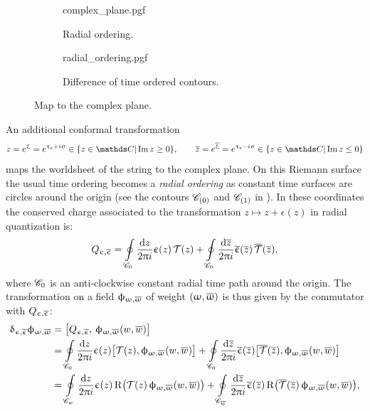 \begin{figure}[tbp]
  \centering
  \begin{subfigure}[b]{0.45\linewidth}
    \centering
    {complex_plane.pgf}
    \caption{Radial ordering.}
  \end{subfigure}
  \hfill
  \begin{subfigure}[b]{0.45\linewidth}
    \centering
    {radial_ordering.pgf}
    \caption{Difference of time ordered contours.}
  \end{subfigure}
  \caption{Map to the complex plane.}
  \label{fig:conf:complex_plane}
\end{figure}

An additional conformal transformation
\begin{equation}
  z = e^{\xi} = e^{\tau_e + i \sigma} \in \qty{ z \in \C | \Im z \ge 0 },
  \qquad
  \barz = e^{\bxi} = e^{\tau_e - i \sigma} \in \qty{ z \in \C | \Im z \le 0 }
\end{equation}
maps the worldsheet of the string to the complex plane.
On this Riemann surface the usual time ordering becomes a \emph{radial ordering} as constant time surfaces are circles around the origin (see the contours $\mathscr{C}_{(0)}$ and $\mathscr{C}_{(1)}$ in ). 
In these coordinates the conserved charge associated to the transformation $z \mapsto z + \epsilon(z)$ in radial quantization is:
\begin{equation}
  Q_{\upepsilon, \overline{\upepsilon}}
  =
  \oint\limits_{\mathscr{C}_{0}}
  \frac{\mathrm{d}z}{2 \uppi i}
  \upepsilon(z)\, \mathcal{T}(z)
  +
  \oint\limits_{\mathscr{C}_{0}}
  \frac{\mathrm{d}\overline{z}}{2 \uppi i}
  \overline{\upepsilon}(\overline{z})\, \overline{\mathcal{T}}(\overline{z}),
\end{equation}
where $\mathscr{C}_0$ is an anti-clockwise constant radial time path around the origin.
The transformation on a field $\upphi_{\upomega, \overline{\upomega}}$ of weight $(\upomega, \overline{\upomega})$ is thus given by the commutator with $Q_{\upepsilon, \overline{\upepsilon}}$:
\begin{equation}
  \begin{split}
    \updelta_{\upepsilon, \overline{\upepsilon}} \upphi_{\upomega, \overline{\upomega}}
    & =
    \left[ Q_{\upepsilon, \overline{\upepsilon}},\, \upphi_{\upomega, \overline{\upomega}}\qty( w, \overline{w} ) \right]
    \\
    & =
    \oint\limits_{\mathscr{C}_{0}} \frac{\mathrm{d}z}{2 \uppi i} \upepsilon(z) \qty[ \mathcal{T}(z), \upphi_{\upomega, \overline{\upomega}}\qty( w, \overline{w} ) ]
    +
    \oint\limits_{\mathscr{C}_{0}} \frac{\mathrm{d}\overline{z}}{2 \uppi i} \overline{\upepsilon}(\overline{z}) \qty[ \overline{\mathcal{T}}(\overline{z}), \upphi_{\upomega, \overline{\upomega}}\qty( w, \overline{w} ) ]
    \\
    & =
    \oint\limits_{\mathscr{C}_{w}} \frac{\mathrm{d}z}{2 \uppi i} \upepsilon(z)\, \mathrm{R}\qty( \mathcal{T}(z)\, \upphi_{\upomega, \overline{\upomega}}( w, \overline{w} ) )
    +
    \oint\limits_{\mathscr{C}_{\overline{w}}} \frac{\mathrm{d}\overline{z}}{2 \uppi i} \overline{\upepsilon}(\overline{z})\, \mathrm{R}\qty( \overline{\mathcal{T}}(\overline{z})\, \upphi_{\upomega, \overline{\upomega}}( w, \overline{w} ) ),
  \end{split}
\end{equation}
